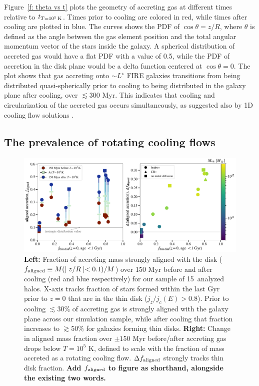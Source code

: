 \documentclass[fleqn,usenatbib]{mnras}
\newcommand{\tcon}{t_{T=10^5\,{\rm K}}}
\newcommand{\Nsample}{15}
\begin{document}
Figure~\ref{f: theta vs t} plots the geometry of accreting gas at different times relative to $\tcon$.
Times prior to cooling are colored in red, while times after cooling are plotted in blue.
The curves shows the PDF of $\cos \theta = z/R$, where $\theta$ is defined as the angle between the gas element position and the total angular momentum vector of the stars inside the galaxy.
A spherical distribution of accreted gas would have a flat PDF with a value of 0.5, while 
the PDF of accretion in the disk plane would be a delta function centered at $\cos\theta = 0$.
The plot shows that gas accreting onto $\sim L^\star$ FIRE galaxies transitions from being distributed quasi-spherically prior to cooling to being distributed in the galaxy plane after cooling, over $\lesssim 300$ Myr.
This indicates that cooling and circularization of the accreted gas occurs simultaneously, as suggested also by 1D cooling flow solutions \citep{Stern2020}.

\subsection{The prevalence of rotating cooling flows}
\label{s: prevalence}

\begin{figure}
    \centering
    \includegraphics[width=\textwidth]{figures/prevalence/aligned_fraction.pdf}
    \caption{
    \textbf{Left:}
    Fraction of accreting mass strongly aligned with the disk ($f_{\rm aligned} \equiv M(\mid z/R \mid < 0.1)/M$) over 150 Myr before and after cooling (red and blue respectively) for our sample of \Nsample~analyzed halos.
    X-axis tracks fraction of stars formed within the last Gyr prior to $z=0$ that are in the thin disk ($j_z/j_c(E)>0.8$).
    Prior to cooling $\lesssim 30\%$ of accreting gas is strongly aligned with the galaxy plane across our simulation sample,
    while after cooling that fraction increases to $\gtrsim 50\%$ for galaxies forming thin disks.
    \textbf{Right:}
    Change in aligned mass fraction over $\pm 150$ Myr before/after accreting gas drops below $T = 10^5$ K, defined to scale with the fraction of mass accreted as a rotating cooling flow.
    $\Delta f_{\rm aligned}$ strongly tracks thin disk fraction.
    \textbf{Add $f_{\rm aligned}$ to figure as shorthand, alongside the existing two words.}
    }
    \label{f: prevalence}
\end{figure}
\end{document}
